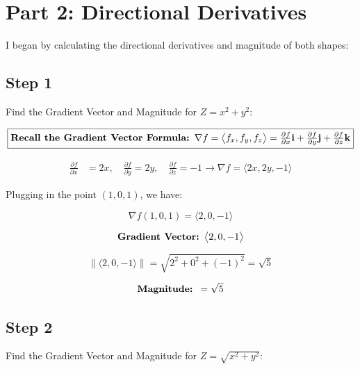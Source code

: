 \documentclass[english]{article}
\begin{document}
\section{Part 2: Directional Derivatives}\label{methods}

I began by calculating the directional derivatives and magnitude of both shapes:


\subsection{Step 1}

Find the Gradient Vector and Magnitude for $Z = x^2 + y^2 $:

$$\fbox{\textbf{Recall the Gradient Vector Formula: $\nabla f = \bigl \langle f_{x}, f_{y}, f_{z} \bigr \rangle = \frac{\partial f}{\partial x} \bold{i} + \frac{\partial f}{\partial y} \bold{j} + \frac{\partial f}{\partial z} \bold{k}$}}$$

\begin{align*}
    \frac{\partial f}{\partial x} &= 2x, \quad
    \frac{\partial f}{\partial y} = 2y, \quad
    \frac{\partial f}{\partial z} = -1 
    \longrightarrow \nabla f = \bigl \langle 2x, 2y, -1 \bigr \rangle
\end{align*}



Plugging in the point $(1,0,1)$, we have:

 $$ \nabla f(1,0,1) = \bigl \langle 2, 0, -1 \bigr \rangle $$

\begin{align*}
    \text{\textbf{Gradient Vector: }} \bigl \langle 2, 0, -1 \bigr \rangle
\end{align*}

$$\left\lVert \bigl \langle 2, 0, -1 \bigr\rangle \right\rVert = \sqrt{2^2 + 0^2 + (-1)^2} = \sqrt{5} $$

\begin{align*}
    \text{\textbf{Magnitude: }} = \sqrt{5}
\end{align*}


\subsection{Step 2}

Find the Gradient Vector and Magnitude for $Z =\sqrt{x^2 + y^2 }$:
\end{document}
